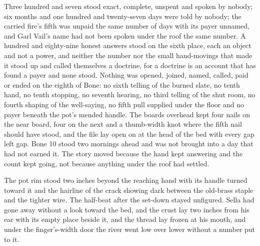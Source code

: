 Three hundred and seven stood exact, complete, unspent and spoken by nobody; six months and one hundred and twenty-seven days were told by nobody; the carried fire's fifth was unpaid the same number of days with its payer unnamed, and Garl Vail's name had not been spoken under the roof the same number. A hundred and eighty-nine honest answers stood on the sixth place, each an object and not a power, and neither the number nor the small hand-movings that made it stood up and called themselves a doctrine, for a doctrine is an account that has found a payer and none stood. Nothing was opened, joined, named, called, paid or ended on the eighth of Bone: no sixth telling of the burned slate, no tenth hand, no tenth stopping, no seventh hearing, no third telling of the shut room, no fourth shaping of the well-saying, no fifth pull supplied under the floor and no payer beneath the pot's mended handle. The boards overhead kept four nails on the near board, four on the next and a thumb-width knot where the fifth nail should have stood, and the file lay open on  at the head of the bed with every gap left gap. Bone 10 stood two mornings ahead and was not brought into a day that had not earned it. The story moved because the hand kept answering and the count kept going, not because anything under the roof had settled.

The pot rim stood two inches beyond the reaching hand with its handle turned toward it and the hairline of the crack showing dark between the old-brass staple and the tighter wire. The half-beat after the set-down stayed unfigured. Sella had gone away without a look toward the bed, and the crust lay two inches from his ear with its empty place beside it, and the thread lay frozen at his mouth, and under the finger's-width door the river went low over lower without a number put to it.
